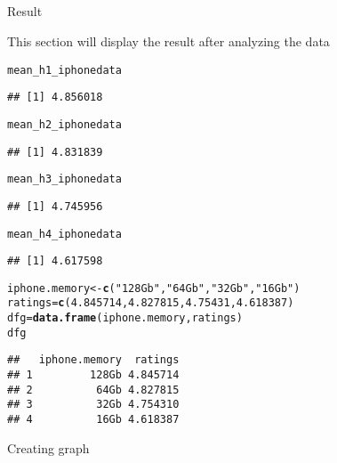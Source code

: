 \documentclass{article}\usepackage[]{graphicx}\usepackage[]{color}
\makeatletter
\newcommand{\hlnum}[1]{\textcolor[rgb]{0.686,0.059,0.569}{#1}}%
\newcommand{\hlstr}[1]{\textcolor[rgb]{0.192,0.494,0.8}{#1}}%
\newcommand{\hlstd}[1]{\textcolor[rgb]{0.345,0.345,0.345}{#1}}%
\newcommand{\hlkwb}[1]{\textcolor[rgb]{0.69,0.353,0.396}{#1}}%
\newcommand{\hlkwd}[1]{\textcolor[rgb]{0.737,0.353,0.396}{\textbf{#1}}}%
\newenvironment{kframe}{%
 \def\at@end@of@kframe{}%
 \ifinner\ifhmode%
  \def\at@end@of@kframe{\end{minipage}}%
  \begin{minipage}{\columnwidth}%
 \fi\fi%
 \def\FrameCommand##1{\hskip\@totalleftmargin \hskip-\fboxsep
 \colorbox{shadecolor}{##1}\hskip-\fboxsep
     \hskip-\linewidth \hskip-\@totalleftmargin \hskip\columnwidth}%
 \MakeFramed {\advance\hsize-\width
   \@totalleftmargin\z@ \linewidth\hsize
   \@setminipage}}%
 {\par\unskip\endMakeFramed%
 \at@end@of@kframe}
\newenvironment{knitrout}{}{} %
\makeatother
\begin{document}
\subsection*{}Result
\par This section will display the result after analyzing the data
\begin{knitrout}
\color{fgcolor}\begin{kframe}
\begin{alltt}
\hlstd{mean_h1_iphonedata}
\end{alltt}
\begin{verbatim}
## [1] 4.856018
\end{verbatim}
\begin{alltt}
\hlstd{mean_h2_iphonedata}
\end{alltt}
\begin{verbatim}
## [1] 4.831839
\end{verbatim}
\begin{alltt}
\hlstd{mean_h3_iphonedata}
\end{alltt}
\begin{verbatim}
## [1] 4.745956
\end{verbatim}
\begin{alltt}
\hlstd{mean_h4_iphonedata}
\end{alltt}
\begin{verbatim}
## [1] 4.617598
\end{verbatim}
\begin{alltt}
\hlstd{iphone.memory}\hlkwb{<-}\hlkwd{c}\hlstd{(}\hlstr{"128Gb"}\hlstd{,}\hlstr{"64Gb"}\hlstd{,}\hlstr{"32Gb"}\hlstd{,}\hlstr{"16Gb"}\hlstd{)}
\hlstd{ratings}\hlkwb{=}\hlkwd{c}\hlstd{(}\hlnum{4.845714}\hlstd{,}\hlnum{4.827815}\hlstd{,}\hlnum{4.75431}\hlstd{,}\hlnum{4.618387}\hlstd{)}
\hlstd{dfg}\hlkwb{=}\hlkwd{data.frame}\hlstd{(iphone.memory,ratings)}
\hlstd{dfg}
\end{alltt}
\begin{verbatim}
##   iphone.memory  ratings
## 1         128Gb 4.845714
## 2          64Gb 4.827815
## 3          32Gb 4.754310
## 4          16Gb 4.618387
\end{verbatim}
\end{kframe}
\end{knitrout}
Creating graph 
\end{document}
